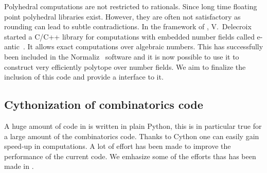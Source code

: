 \documentclass{deliverablereport}
\begin{document}
Polyhedral computations are not restricted to rationals. Since long time
floating point polyhedral libraries exist. However, they are often not
satisfactory as rounding can lead to subtle contradictions. In the framework
of \ODK, V.~Delecroix started a C/C++ library for computations with embedded
number fields called e-antic~\cite{eantic-code}. It allows exact computations
over algebraic numbers. This has successfully been included in the
Normaliz~\cite{normaliz-code} software and it is now possible to use
it to construct very efficiently polytope over number fields. We aim to
finalize the inclusion of this code and provide a \Sage interface to it.


\subsection{Cythonization of combinatorics code}

A huge amount of code in \Sage is written in plain Python, this is in
particular true for a large amount of the combinatorics code. Thanks to
Cython one can easily gain speed-up in computations. A lot of effort has
been made to improve the performance of the current code. We emhasize
some of the efforts thas has been made in \ODK.
\end{document}
